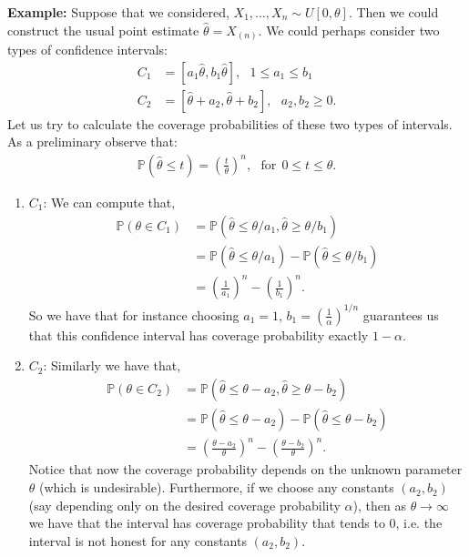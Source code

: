 \documentclass[twoside,12pt]{article}
\begin{document}
{\bf Example: } Suppose that we considered, $X_1,\ldots,X_n \sim U[0,\theta]$. Then we could construct the usual point estimate $\widehat{\theta} = X_{(n)}.$ We could perhaps consider two types of confidence intervals:
\begin{align*}
C_1 &= [a_1\widehat{\theta}, b_1\widehat{\theta}],~~~1 \leq a_1 \leq b_1 \\
C_2 &= [\widehat{\theta} + a_2, \widehat{\theta} + b_2],~~~a_2, b_2\geq 0.
\end{align*}
Let us try to calculate the coverage probabilities of these two types of intervals. As a preliminary observe that:
\begin{align*}
\mathbb{P}(\widehat{\theta} \leq t) = \left(\frac{t}{\theta}\right)^n, ~~~\text{for}~~0 \leq t \leq \theta.
\end{align*}
\begin{enumerate}
\item $C_1$: 
We can compute that,
\begin{align*}
\mathbb{P}(\theta \in C_1) &= \mathbb{P}(\widehat{\theta} \leq \theta/a_1, \widehat{\theta} \geq \theta/b_1) \\
&= \mathbb{P}(\widehat{\theta} \leq \theta/a_1) -  \mathbb{P}(\widehat{\theta} \leq \theta/b_1) \\
&= \left(\frac{1}{a_1}\right)^n - \left(\frac{1}{b_1}\right)^n.
\end{align*}
So we have that for instance choosing $a_1 = 1$, $b_1 = \left(\frac{1}{\alpha}\right)^{1/n}$ guarantees us that this confidence interval has coverage probability exactly $1 - \alpha$. 
\item $C_2$: Similarly we have that,
\begin{align*}
\mathbb{P}(\theta \in C_2) &= \mathbb{P}(\widehat{\theta} \leq \theta - a_2 , \widehat{\theta} \geq \theta - b_2) \\
&= \mathbb{P}(\widehat{\theta} \leq \theta - a_2) -  \mathbb{P}(\widehat{\theta} \leq \theta - b_2) \\
&= \left(\frac{\theta - a_2}{\theta}\right)^n - \left(\frac{\theta - b_2}{\theta}\right)^n.
\end{align*}
Notice that now the coverage probability depends on the unknown parameter $\theta$ (which is undesirable). Furthermore, if we choose any constants $(a_2,b_2)$ (say depending only on the desired coverage probability $\alpha$), then as $\theta \rightarrow \infty$ we have that the interval has coverage probability that tends to 0, i.e. the interval is not honest for any constants $(a_2,b_2)$.
\end{enumerate}
\end{document}
